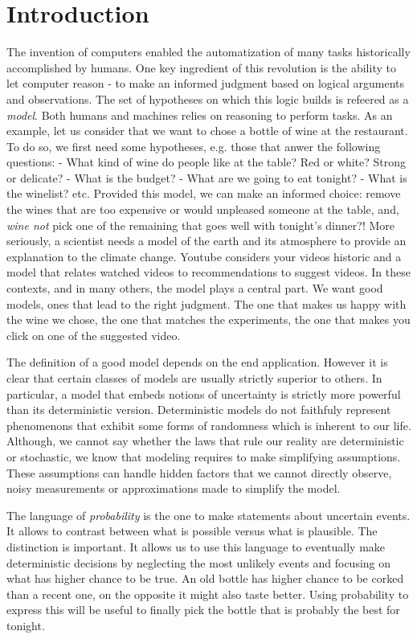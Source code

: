 \section{Introduction}
The invention of computers enabled the automatization of many tasks historically accomplished by humans.
One key ingredient of this revolution is the ability to let computer reason - to make an informed judgment based on logical arguments and observations.
The set of hypotheses on which this logic builds is refeered as a \textit{model}. Both humans and machines relies on reasoning to perform tasks. As an example, let us consider that we want to chose a bottle of wine at the restaurant. To do so, we first need some hypotheses, e.g. those that anwer the following questions: - What kind of wine do people like at the table? Red or white? Strong or delicate? - What is the budget? - What are we going to eat tonight? - What is the winelist? etc. Provided this model, we can make an informed choice: remove the wines that are too expensive or would unpleased someone at the table, and, \textit{wine not} pick one of the remaining that goes well with tonight's dinner?! More seriously, a scientist needs a model of the earth and its atmosphere to provide an explanation to the climate change. Youtube considers your videos historic and a model that relates watched videos to recommendations to suggest videos. In these contexts, and in many others, the model plays a central part. We want good models, ones that lead to the right judgment. The one that makes us happy with the wine we chose, the one that matches the experiments, the one that makes you click on one of the suggested video.

The definition of a good model depends on the end application. However it is clear that certain classes of models are usually strictly superior to others.
In particular, a model that embeds notions of uncertainty is strictly more powerful than its deterministic version. Deterministic models do not faithfuly represent phenomenons that exhibit some forms of randomness which is inherent to our life. Although, we cannot say whether the laws that rule our reality are deterministic or stochastic, we know that modeling requires to make simplifying assumptions. These assumptions can handle hidden factors that we cannot directly observe, noisy measurements or approximations made to simplify the model.

The language of \textit{probability} is the one to make statements about uncertain events. It allows to contrast between what is possible versus what is plausible. The distinction is important. It allows us to use this language to eventually make deterministic decisions by neglecting the most unlikely events and focusing on what has higher chance to be true. An old bottle has higher chance to be corked than a recent one, on the opposite it might also taste better. Using probability to express this will be useful to finally pick the bottle that is probably the best for tonight.

